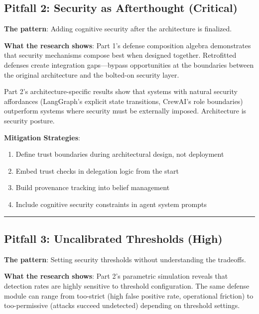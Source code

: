 \documentclass[
]{article}
\providecommand{\tightlist}{%
  \setlength{\itemsep}{0pt}\setlength{\parskip}{0pt}}
\begin{document}
\subsection{Pitfall 2: Security as Afterthought
(Critical)}\label{pitfall-2-security-as-afterthought-critical}

\textbf{The pattern}: Adding cognitive security after the architecture
is finalized.

\textbf{What the research shows}: Part 1's defense composition algebra
demonstrates that security mechanisms compose best when designed
together. Retrofitted defenses create integration gaps---bypass
opportunities at the boundaries between the original architecture and
the bolted-on security layer.

Part 2's architecture-specific results show that systems with natural
security affordances (LangGraph's explicit state transitions, CrewAI's
role boundaries) outperform systems where security must be externally
imposed. Architecture is security posture.

\textbf{Mitigation Strategies}:

\begin{enumerate}
\def\labelenumi{\arabic{enumi}.}
\tightlist
\item
  Define trust boundaries during architectural design, not deployment
\item
  Embed trust checks in delegation logic from the start
\item
  Build provenance tracking into belief management
\item
  Include cognitive security constraints in agent system prompts
\end{enumerate}

\begin{center}\rule{0.5\linewidth}{0.5pt}\end{center}

\subsection{Pitfall 3: Uncalibrated Thresholds
(High)}\label{pitfall-3-uncalibrated-thresholds-high}

\textbf{The pattern}: Setting security thresholds without understanding
the tradeoffs.

\textbf{What the research shows}: Part 2's parametric simulation reveals
that detection rates are highly sensitive to threshold configuration.
The same defense module can range from too-strict (high false positive
rate, operational friction) to too-permissive (attacks succeed
undetected) depending on threshold settings.
\end{document}
